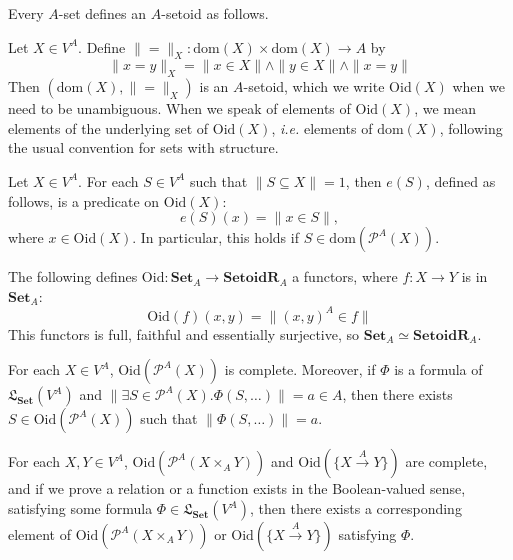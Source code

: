 \documentclass{lmcs}
\newcommand{\dom}{\ensuremath{\mathrm{dom}}}
\newcommand{\Set}{\cat{Set}}
\newcommand{\cat}[1]{\ensuremath{\mathbf{#1}}}
\newcommand{\powerset}{\ensuremath{\mathcal{P}}}
\newcommand{\Lang}{\mathfrak{L}}
\newcommand{\apowerset}{\powerset^A}
\newcommand{\atimes}{\mathrel{\times_{\!A}}}
\newcommand{\ahom}[2]{\{ #1 \overset{A}{\rightarrow} #2 \}}
\newcommand{\beq}{\|\mbox{$=$}\|}
\newcommand{\SetoidR}{\cat{SetoidR}}
\newcommand{\Oid}{\mathrm{Oid}}
\begin{document}
Every $A$-set defines an $A$-setoid as follows.

\begin{defi}
	\label{SetsAreSetoidsDefinition}
	Let $X \in V^A$. Define $\beq_X : \dom(X)\times\dom(X) \rightarrow A$ by
	\begin{equation}
		\label{SetSetoidEqn}
		\| x = y \|_X = \| x \in X \| \land \|y \in X \| \land \|x = y\|
	\end{equation}
	Then $(\dom(X), \beq_X)$ is an $A$-setoid, which we write $\Oid(X)$ when we need to be unambiguous. When we speak of elements of $\Oid(X)$, we mean elements of the underlying set of $\Oid(X)$, \emph{i.e.} elements of $\dom(X)$, following the usual convention for sets with structure. \qedhere
\end{defi}

\begin{defi}
	\label{OidSubsetDef}
	Let $X \in V^A$. For each $S \in V^A$ such that $\| S \subseteq X \| = 1$, then $e(S)$, defined as follows, is a predicate on $\Oid(X)$:
	\[
	e(S)(x) = \| x \in S \|,
	\]
	where $x \in \Oid(X)$. In particular, this holds if $S \in \dom(\apowerset(X))$. \qedhere
\end{defi}

\begin{defi}
	\label{OidFunctorDef}
	The following defines $\Oid : \Set_A \rightarrow \SetoidR_A$ a functors, where $f : X \rightarrow Y$ is in $\Set_A$:
	\[
	\Oid(f)(x,y) = \| (x,y)^A \in f \|
	\]
	This functors is full, faithful and essentially surjective, so $\Set_A \simeq \SetoidR_A$. \qedhere
\end{defi}

\begin{thm}
	\label{PowerSetCompletenessTheorem}
	For each $X \in V^A$, $\Oid(\apowerset(X))$ is complete. Moreover, if $\Phi$ is a formula of $\Lang_\Set(V^A)$ and $\| \exists S \in \apowerset(X) . \Phi(S,\ldots) \| = a \in A$, then there exists $S \in \Oid(\apowerset(X))$ such that $\| \Phi(S,\ldots)\| = a$. \qedhere
\end{thm}

\begin{cor}
	\label{RelFuncExistenceCor}
	For each $X,Y \in V^A$, $\Oid(\apowerset(X \atimes Y))$ and $\Oid(\ahom{X}{Y})$ are complete, and if we prove a relation or a function exists in the Boolean-valued sense, satisfying some formula $\Phi \in \Lang_\Set(V^A)$, then there exists a corresponding element of $\Oid(\apowerset(X \atimes Y))$ or $\Oid(\ahom{X}{Y})$ satisfying $\Phi$. \qedhere
\end{cor}
\end{document}
